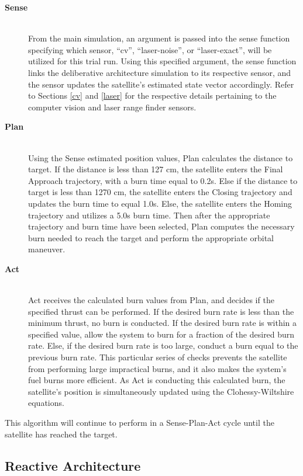 \documentclass[journal, 10pt]{IEEEtran}
\begin{document}
\begin{description}
\item[\textbf{Sense}] \hfill \\
From the main simulation, an argument is passed into the sense function specifying which sensor, ``cv'', ``laser-noise'', or ``laser-exact'', will be utilized for this trial run. Using this specified argument, the sense function links the deliberative architecture simulation to its respective sensor, and the sensor updates the satellite's estimated state vector accordingly. Refer to Sections \ref{cv} and \ref{laser} for the respective details pertaining to the computer vision and laser range finder sensors.

\item[\textbf{Plan}] \hfill \\
Using the Sense estimated position values, Plan calculates the distance to target. If the distance is less than 127 cm, the satellite enters the Final Approach trajectory, with a burn time equal to 0.2s. Else if the distance to target is less than 1270 cm, the satellite enters the Closing trajectory and updates the burn time to equal 1.0s. Else, the satellite enters the Homing trajectory and utilizes a 5.0s burn time. Then after the appropriate trajectory and burn time have been selected, Plan computes the necessary burn needed to reach the target and perform the appropriate orbital maneuver.

\item[\textbf{Act}] \hfill \\
Act receives the calculated burn values from Plan, and decides if the specified thrust can be performed. If the desired burn rate is less than the minimum thrust, no burn is conducted. If the desired burn rate is within a specified value, allow the system to burn for a fraction of the desired burn rate. Else, if the desired burn rate is too large, conduct a burn equal to the previous burn rate. This particular series of checks prevents the satellite from performing large impractical burns, and it also makes the system's fuel burns more efficient. As Act is conducting this calculated burn, the satellite's position is simultaneously updated using the Clohessy-Wiltshire equations. 
\end{description}

This algorithm will continue to perform in a Sense-Plan-Act cycle until the satellite has reached the target.

\subsection{Reactive Architecture}
\end{document}
